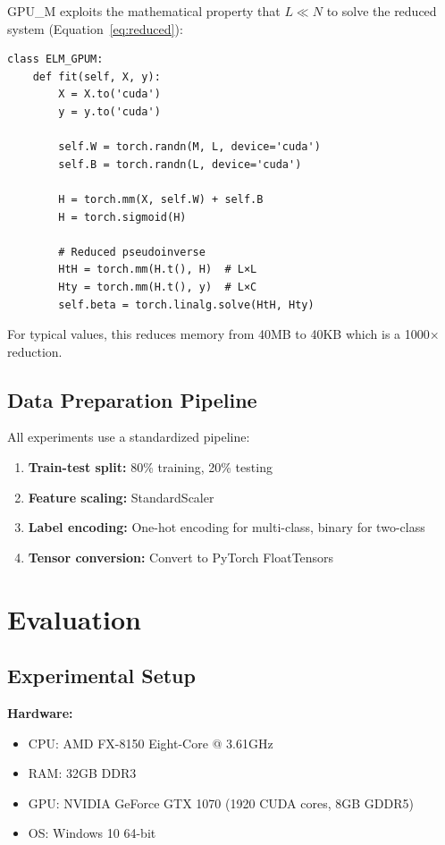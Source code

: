 \documentclass[conference]{IEEEtran}
\begin{document}
GPU\_M exploits the mathematical property that $L \ll N$ to solve the reduced system (Equation~\ref{eq:reduced}):

{\small\begin{verbatim}
class ELM_GPUM:
    def fit(self, X, y):
        X = X.to('cuda')
        y = y.to('cuda')
        
        self.W = torch.randn(M, L, device='cuda')
        self.B = torch.randn(L, device='cuda')
        
        H = torch.mm(X, self.W) + self.B
        H = torch.sigmoid(H)
        
        # Reduced pseudoinverse
        HtH = torch.mm(H.t(), H)  # L×L
        Hty = torch.mm(H.t(), y)  # L×C
        self.beta = torch.linalg.solve(HtH, Hty)
\end{verbatim}}

For typical values, this reduces memory from 40MB to 40KB which is a 1000× reduction.

\subsection{Data Preparation Pipeline}

All experiments use a standardized pipeline:

\begin{enumerate}
\item \textbf{Train-test split:} 80\% training, 20\% testing
\item \textbf{Feature scaling:} StandardScaler
\item \textbf{Label encoding:} One-hot encoding for multi-class, binary for two-class
\item \textbf{Tensor conversion:} Convert to PyTorch FloatTensors
\end{enumerate}

\section{Evaluation}
\label{sec:evaluation}

\subsection{Experimental Setup}

\textbf{Hardware:}
\begin{itemize}
\item CPU: AMD FX-8150 Eight-Core @ 3.61GHz
\item RAM: 32GB DDR3
\item GPU: NVIDIA GeForce GTX 1070 (1920 CUDA cores, 8GB GDDR5)
\item OS: Windows 10 64-bit
\end{itemize}
\end{document}
